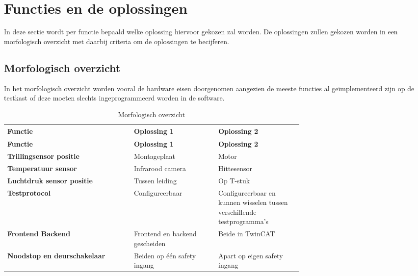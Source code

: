 \section{Functies en de oplossingen}

In deze sectie wordt per functie bepaald welke oplossing hiervoor gekozen zal worden. De oplossingen zullen gekozen worden in een morfologisch overzicht met daarbij criteria om de oplossingen te becijferen.

\subsection{Morfologisch overzicht}

In het morfologisch overzicht worden vooral de hardware eisen doorgenomen aangezien de meeste functies al geïmplementeerd zijn op de testkast of deze moeten slechts ingeprogrammeerd worden in de software.

\begin{xltabular}{\linewidth}{|p{0.3\linewidth}|p{0.2\linewidth}|p{0.2\linewidth}|}
	\caption{Morfologisch overzicht} \\
	\hline
	\textbf{Functie} & \textbf{Oplossing 1} & \textbf{Oplossing 2} \\
	\hline
	\endfirsthead
	\hline
	\textbf{Functie} & \textbf{Oplossing 1} & \textbf{Oplossing 2} \\
	\hline
	\endhead
	\hline
	\endfoot
	\hline
	\endlastfoot
	\textbf{Trillingsensor positie} &  Montageplaat & Motor \\
	\hline
	\textbf{Temperatuur sensor} &  Infrarood camera & Hittesensor \\
	\hline
	\textbf{Luchtdruk sensor positie} & Tussen leiding &  Op T-stuk \\
	\hline

	\textbf{Testprotocol} & Configureerbaar &  Configureerbaar en kunnen wisselen tussen verschillende testprogramma's \\
	\hline
	\textbf{Frontend Backend} &  Frontend en backend gescheiden & Beide in TwinCAT \\
	\hline
	\textbf{Noodstop en deurschakelaar} & Beiden op één safety ingang &  Apart op eigen safety ingang \\
	\hline
\end{xltabular}

